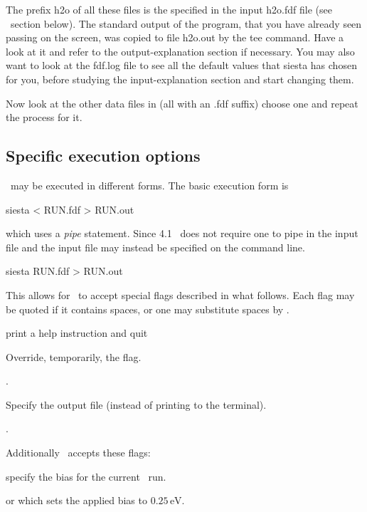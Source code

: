 The prefix h2o of all these files is the 
specified in the input h2o.fdf file (see \fdflib\ section below).
The standard output of the program, that you
have already seen passing on the screen, was copied to
file h2o.out by the tee command. Have a look at it
and refer to the output-explanation section if necessary.
You may also want to look at the fdf.log file to see all
the default values that siesta has chosen for you, before
studying the input-explanation section and start changing them.

Now look at the other data files in 
(all with an .fdf suffix) choose one and repeat the process for it.

\subsection{Specific execution options}

\siesta\ may be executed in different forms. The basic execution form
is
\begin{shellexample}
  siesta < RUN.fdf > RUN.out
\end{shellexample}
which uses a \emph{pipe} statement. 
%
Since 4.1 \siesta\ does not require one to pipe in the input file and
the input file may instead be specified on the command line.
\begin{shellexample}
  siesta RUN.fdf > RUN.out
\end{shellexample}
This allows for \siesta\ to accept special flags described in what
follows. Each flag may be quoted if it contains spaces, or one may
substitute spaces by \fdf*{:}.
\begin{fdfoptions}

  \option[-h]%
  print a help instruction and quit

  \option[-L]%
  Override, temporarily, the  flag. 

  .

  \option[-out|-o]%
  Specify the output file (instead of printing to the terminal).

  .

\end{fdfoptions}
Additionally \tsiesta\ accepts these flags:
\begin{fdfoptions}

  \option[-V]%
  specify the bias for the current \tsiesta\ run. 

   or 
  which sets the applied bias to $0.25\,\mathrm{eV}$.

\end{fdfoptions}


